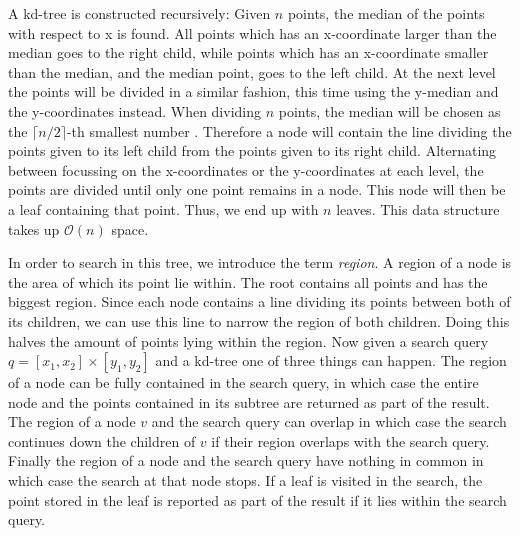 A kd-tree is constructed recursively: Given $n$ points, the median of the points with respect to x is found. All points which has an x-coordinate larger than the median goes to the right child, while points which has an x-coordinate smaller than the median, and the median point, goes to the left child. At the next level the points will be divided in a similar fashion, this time using the y-median and the y-coordinates instead. When dividing $n$ points, the median will be chosen as the $\lceil n/2 \rceil$-th smallest number \cite{compgeo}. Therefore a node will contain the line dividing the points given to its left child from the points given to its right child.
Alternating between focussing on the x-coordinates or the y-coordinates at each level, the points are divided until only one point remains in a node. This node will then be a leaf containing that point. Thus, we end up with $n$ leaves. This data structure takes up $\mathcal{O}(n)$ space.

In order to search in this tree, we introduce the term \emph{region}. A region of a node is the area of which its point lie within. The root contains all points and has the biggest region. Since each node contains a line dividing its points between both of its children, we can use this line to narrow the region of both children. Doing this halves the amount of points lying within the region. Now given a search query $q = [x_1, x_2] \times [y_1, y_2]$ and a kd-tree one of three things can happen. The region of a node can be fully contained in the search query, in which case the entire node and the points contained in its subtree are returned as part of the result. The region of a node $v$ and the search query can overlap in which case the search continues down the children of $v$ if their region overlaps with the search query. Finally the region of a node and the search query have nothing in common in which case the search at that node stops. If a leaf is visited in the search, the point stored in the leaf is reported as part of the result if it lies within the search query. 

